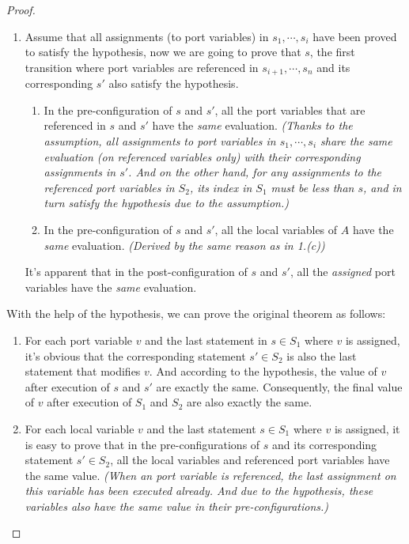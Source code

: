 \begin{proof}
\begin{enumerate}
        \item Assume that all assignments (to port variables) in $s_1,\cdots,s_i$ have been proved to satisfy the hypothesis, now we are going to prove that $s$, the first transition where port variables are referenced in $s_{i+1},\cdots,s_n$ and its corresponding $s'$ also satisfy the hypothesis.

        \begin{enumerate}
            \item In the pre-configuration of $s$ and $s'$, all the port variables that are referenced in $s$ and $s'$ have the \emph{same} evaluation. \emph{(Thanks to the assumption, all assignments to port variables in $s_1,\cdots,s_i$ share the same evaluation (on referenced variables only) with their corresponding assignments in $s'$. And on the other hand, for any assignments to the referenced port variables in $S_2$, its index in $S_1$ must be less than $s$, and in turn satisfy the hypothesis due to the assumption.)}
            \item In the pre-configuration of $s$ and $s'$, all the local variables of $A$ have the \emph{same} evaluation. \emph{(Derived by the same reason as in 1.(c))}
        \end{enumerate}

        It's apparent that in the post-configuration of $s$ and $s'$, all the \emph{assigned} port variables have the \emph{same} evaluation.
    \end{enumerate}

    With the help of the hypothesis, we can prove the original theorem as follows:
    \begin{enumerate}
        \item For each port variable $v$ and the last statement in $s\in S_1$ where $v$ is assigned, it's obvious that the corresponding statement $s'\in S_2$ is also the last statement that modifies $v$. And according to the hypothesis, the value of $v$ after execution of $s$ and $s'$ are exactly the same. Consequently, the final value of $v$ after execution of $S_1$ and $S_2$ are also exactly the same.
        \item For each local variable $v$ and the last statement $s\in S_1$ where $v$ is assigned, it is easy to prove that in the pre-configurations of $s$ and its corresponding statement $s'\in S_2$, all the local variables and referenced port variables have the same value. \emph{(When an port variable is referenced, the last assignment on this variable has been executed already. And due to the hypothesis, these variables also have the same value in their pre-configurations.)}
    \end{enumerate}
\end{proof}